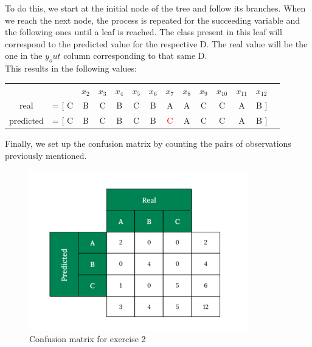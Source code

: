 \documentclass[12pt]{article}
\begin{document}
\begin{enumerate}[leftmargin=\labelsep]
To do this, we start at the initial node of the tree and follow its branches. When we reach the next node, the process is repeated for the succeeding variable and the following ones until a leaf is reached.
The class present in this leaf will correspond to the predicted value for the respective D. The real value will be the one in the $y_out$ column corresponding to that same D.\\

This results in the following values:

\begin{center}
    \begin{tabular}{cccccccccccccc}
        \multicolumn{2}{c}{}  $x_1$ & $x_2$ & $x_3$ & $x_4$ & $x_5$ & $x_6$ & $x_7$ & $x_8$ & $x_9$ & $x_{10}$ & $x_{11}$ & $x_{12}$ \\
        \multirow{1}{*}{real}      & =    [ C & B & C & B & C & B & A & A & C & C & A & B  ] \\
        \multirow{1}{*}{predicted} & =   [ C & B & C & B & C & B & \textcolor{red}{C} & A & C & C & A & B  ]
  \end{tabular}
\end{center}

\vspace{0.2cm}
Finally, we set up the confusion matrix by counting the pairs of observations previously mentioned.

\vspace{0.2cm}

\begin{figure}[H]
          \centering
          \includegraphics[width=9.5cm]{Confusion Matrix.pdf}
          \caption{Confusion matrix for exercise 2}
          \label{fig:Confusion matrix}
        \end{figure}

\vspace{0.5cm}


\end{enumerate}
\end{document}
